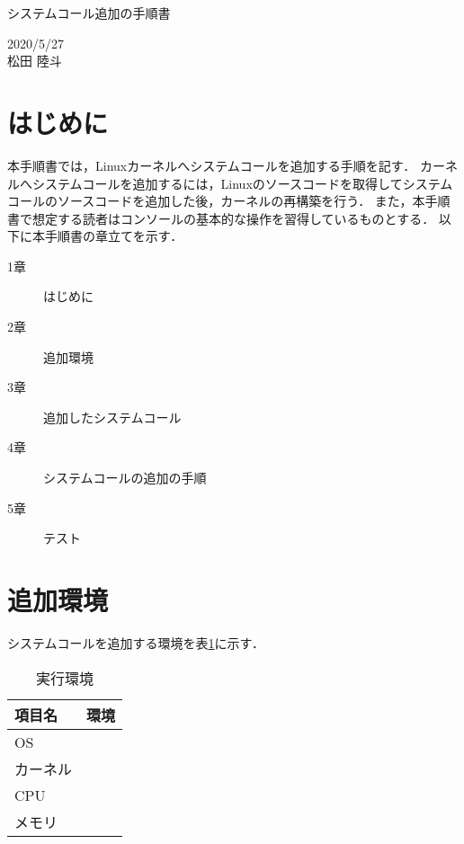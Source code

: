 \documentclass[12pt]{jsarticle}
\begin{document}
\begin{center}
{\LARGE システムコール追加の手順書}
\end{center}

\begin{flushright}
  2020/5/27\\
  松田 陸斗
\end{flushright}
\section{はじめに}
\label{sec:introduction}
本手順書では，Linuxカーネルへシステムコールを追加する手順を記す．
カーネルへシステムコールを追加するには，Linuxのソースコードを取得してシステムコールのソースコードを追加した後，カーネルの再構築を行う．
また，本手順書で想定する読者はコンソールの基本的な操作を習得しているものとする．
以下に本手順書の章立てを示す．
\begin{description}
\item[1章] はじめに\\
\item[2章] 追加環境\\
\item[3章] 追加したシステムコール\\
\item[4章] システムコールの追加の手順\\
\item[5章] テスト\\
\end{description}

\section{追加環境}
システムコールを追加する環境を表\ref{env}に示す．

\begin{table}[h]
\begin{center}
	\caption{実行環境}\label{env}
	\begin{tabular}{l|l}
	\hline\hline
	\multicolumn{1}{l|}{項目名} & \multicolumn{1}{l}{環境}\\
	\hline
	OS & \\
	カーネル & \\
	CPU & \\
	メモリ & \\
	\hline
	\end{tabular}
\end{center}
\end{table}
\end{document}
